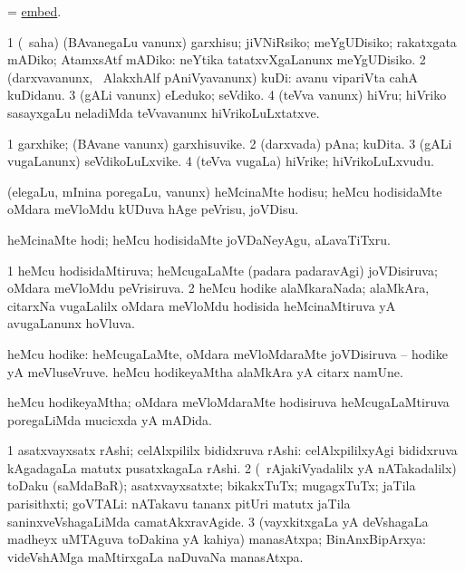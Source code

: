 \bentry
{}
\gl{\sakirx}
\bmng
= \hyperref{kandict_e.pdf}{E}{embed}{embed}. 
\emng
\eentry

\bentry
{}
\gl{\sakirx}
\bmng
\bnum
\num{1} (\akirx\ saha) (BAvanegaLu \mo vanunx) garxhisu; jiVNiRsiko; meYgUDisiko; rakatxgata mADiko; AtamxsAtf mADiko:  neYtika tatatxvXgaLanunx meYgUDisiko. 
\num{2} (darxvavanunx, \kanmu\ AlakxhAlf pAniVyavanunx) kuDi:  avanu vipariVta cahA kuDidanu. 
\num{3} (gALi \mo vanunx) eLeduko; seVdiko. 
\num{4} (teVva \mo vanunx) hiVru; hiVriko  sasayxgaLu neladiMda teVvavanunx hiVrikoLuLxtatxve. 
\enum
\emng
\eentry

\bentry
{}
\gl{\nA}
\bmng
\bnum
\num{1} garxhike; (BAvane \mo vanunx) garxhisuvike. 
\num{2} (darxvada) pAna; kuDita. 
\num{3} (gALi \mo vugaLanunx) seVdikoLuLxvike. 
\num{4} (teVva \mo vugaLa) hiVrike; hiVrikoLuLxvudu. 
\enum
\emng
\eentry

\bentry
{}
\gl{\sakirx}
\bmng
(elegaLu, mInina poregaLu, \mo vanunx) heMcinaMte hodisu; heMcu hodisidaMte oMdara meVloMdu kUDuva hAge peVrisu, joVDisu. 
\emng

\noindent
\gl{\akirx}
\bmng
heMcinaMte hodi; heMcu hodisidaMte joVDaNeyAgu, aLavaTiTxru. 
\emng
\eentry

\bentry
{}
\gl{\gu}
\bmng
\bnum
\num{1} heMcu hodisidaMtiruva; heMcugaLaMte (padara padaravAgi) joVDisiruva; oMdara meVloMdu peVrisiruva. 
\num{2} heMcu hodike alaMkaraNada; alaMkAra, citarxNa \mo vugaLalilx oMdara meVloMdu hodisida heMcinaMtiruva yA avugaLanunx hoVluva. 
\enum
\emng
\eentry

\bentry
{}
\gl{\nA}
\bmng
heMcu hodike: 
\banum
{} heMcugaLaMte, oMdara meVloMdaraMte joVDisiruva -- hodike yA meVluseVruve.   
 heMcu hodikeyaMtha alaMkAra yA citarx namUne. 
\eanum
\emng
\eentry

\bentry
{}
\gl{\gu}
\bmng
heMcu hodikeyaMtha; oMdara meVloMdaraMte hodisiruva heMcugaLaMtiruva poregaLiMda mucicxda yA mADida. 
\emng
\eentry

\bentry
{}
\gl{\nA}
\bmng
\bnum
\num{1} asatxvayxsatx rAshi; celAlxpililx bididxruva rAshi:  celAlxpililxyAgi bididxruva kAgadagaLa matutx pusatxkagaLa rAshi. 
\num{2} (\kanmu\ rAjakiVyadalilx yA nATakadalilx) toDaku (saMdaBaR); asatxvayxsatxte; bikakxTuTx; mugagxTuTx; jaTila parisithxti; goVTALi:  nATakavu tananx pitUri matutx jaTila saninxveVshagaLiMda camatAkxravAgide. 
\num{3} (vayxkitxgaLa yA deVshagaLa madheyx uMTAguva toDakina yA kahiya) manasAtxpa; BinAnxBipArxya:  videVshAMga maMtirxgaLa naDuvaNa manasAtxpa. 
\enum
\emng
\eentry

